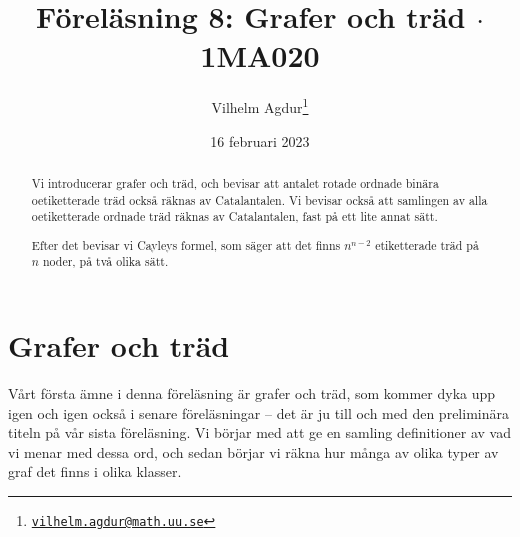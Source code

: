 \documentclass[nobib]{tufte-handout}
\title{Föreläsning 8: Grafer och träd $\cdot$ 1MA020}
\author[Vilhelm Agdur]{Vilhelm Agdur\thanks{\href{mailto:vilhelm.agdur@math.uu.se}{\nolinkurl{vilhelm.agdur@math.uu.se}}}}
\date{16 februari 2023}
\begin{document}

\maketitle%

\begin{abstract}
\noindent
Vi introducerar grafer och träd, och bevisar att antalet rotade ordnade binära oetiketterade träd också räknas av Catalantalen. Vi bevisar också att samlingen av alla oetiketterade ordnade träd räknas av Catalantalen, fast på ett lite annat sätt.

Efter det bevisar vi Cayleys formel, som säger att det finns $n^{n-2}$ etiketterade träd på $n$ noder, på två olika sätt.
\end{abstract}

\section{Grafer och träd}

Vårt första ämne i denna föreläsning är grafer och träd, som kommer dyka upp igen och igen också i senare föreläsningar -- det är ju till och med den preliminära titeln på vår sista föreläsning. Vi börjar med att ge en samling definitioner av vad vi menar med dessa ord, och sedan börjar vi räkna hur många av olika typer av graf det finns i olika klasser.
\end{document}

